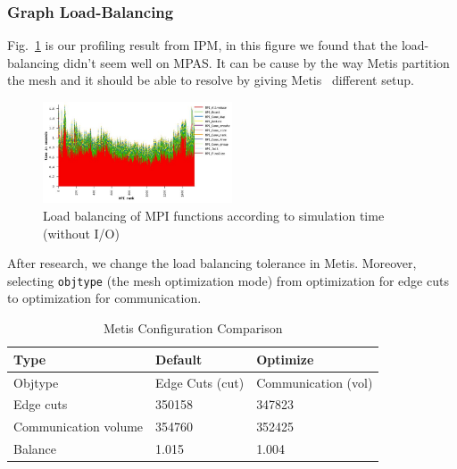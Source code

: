
\subsubsection{Graph Load-Balancing}
Fig.~\ref{figure:profile-before} is our profiling result from IPM, in this figure we found that the load-balancing didn't seem well on MPAS. It can be cause by the way Metis partition the mesh and it should be able to resolve by giving Metis~\cite{metis} different setup. 

\begin{figure}[t]
    \centering
    \includegraphics[width=0.5\textwidth]{profileBefore.JPG} 
    \caption{Load balancing of MPI functions according to simulation time (without I/O)}
    \label{figure:profile-before}
\end{figure}

After research, we change the load balancing tolerance in Metis. Moreover, selecting \texttt{objtype} (the mesh optimization mode) from optimization for edge cuts to optimization for communication.

\begin{table}[t]
    \centering
    \caption{Metis Configuration Comparison}
    \begin{tabular}{lll}
        \toprule
        Type & Default & Optimize  \\
        \midrule
        Objtype & Edge Cuts (cut) & Communication (vol) \\
        Edge cuts & 350158 & 347823 \\
        Communication volume & 354760 & 352425 \\
        Balance & 1.015 & 1.004 \\
        \bottomrule
    \end{tabular}
    \label{table:metis-configuration}
\end{table}

